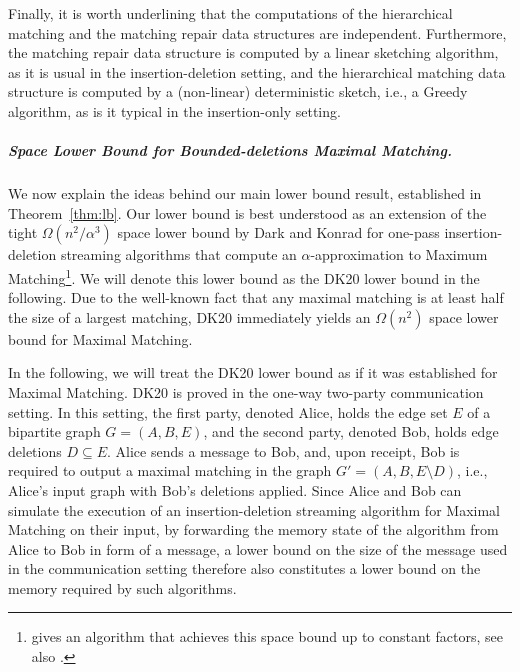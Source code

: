 \documentclass[11pt,a4paper]{article}
\begin{document}
Finally, it is worth underlining that the computations of the hierarchical matching and the matching repair data structures are independent. Furthermore, the matching repair data structure is computed by a linear sketching algorithm, as it is usual in the insertion-deletion setting, and the hierarchical matching data structure is computed by a (non-linear) deterministic sketch, i.e., a Greedy algorithm, as is it typical in the insertion-only setting. 


\subparagraph{Space Lower Bound for Bounded-deletions  \textsf{Maximal Matching}.}
We now explain the ideas behind our main lower bound result, established in Theorem~\ref{thm:lb}.
Our lower bound is best understood as an extension of the tight $\Omega(n^2 / \alpha^3)$ space lower bound by Dark and Konrad \cite{dk20} for one-pass insertion-deletion streaming algorithms that compute an $\alpha$-approximation to \textsf{Maximum Matching}\footnote{\cite{as22} gives an algorithm that achieves this space bound up to constant factors, see also \cite{k15,akl16,ccehmmv16}.}. We will denote this lower bound as the DK20 lower bound in the following. %
Due to the well-known fact that any maximal matching is at least half the size of a largest matching, DK20 immediately yields an $\Omega(n^2)$ space lower bound for \textsf{Maximal Matching}. 

In the following, we will treat the DK20 lower bound as if it was established for  \textsf{Maximal Matching}. DK20 is proved in the one-way two-party communication setting. In this setting, the first party, denoted Alice, holds the edge set $E$ of a bipartite graph $G=(A, B, E)$, and the second party, denoted Bob, holds edge deletions $D \subseteq E$. Alice sends a message to Bob, and, upon receipt, Bob is required to output a maximal matching in the graph $G' = (A, B, E \setminus D)$, i.e., Alice's input graph with Bob's deletions applied. Since Alice and Bob can simulate the execution of an insertion-deletion streaming algorithm for \textsf{Maximal Matching} on their input, by forwarding the memory state of the algorithm from Alice to Bob in form of a message, a lower bound on the size of the message used in the communication setting therefore also constitutes a lower bound on the memory required by such algorithms. %
\end{document}
